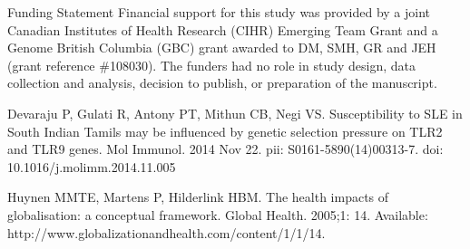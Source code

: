 \documentclass[10pt,letterpaper]{article}
\begin{document}
Funding Statement
Financial support for this study was provided by a joint Canadian Institutes of Health Research (CIHR) Emerging Team Grant and a Genome British Columbia (GBC) grant awarded to DM, SMH, GR and JEH (grant reference \#108030). The funders had no role in study design, data collection and analysis, decision to publish, or preparation of the manuscript.

\nolinenumbers

%
%


\begin{thebibliography}{10}
Devaraju P, Gulati R, Antony PT, Mithun CB, Negi VS. Susceptibility to SLE in South Indian Tamils may be influenced by genetic selection pressure on TLR2 and TLR9 genes. Mol Immunol. 2014 Nov 22. pii: S0161-5890(14)00313-7. doi: 10.1016/j.molimm.2014.11.005

Huynen MMTE, Martens P, Hilderlink HBM. The health impacts of globalisation: a conceptual framework. Global Health. 2005;1: 14. Available: http://www.globalizationandhealth.com/content/1/1/14.

\end{thebibliography}
\end{document}
